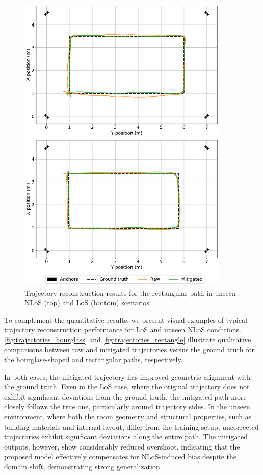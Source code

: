 \begin{figure}[tbh]
    \centering
    \includegraphics[width=0.9\textwidth]{Figures/experiments_and_results/rect_trajectory.pdf}
    \caption{Trajectory reconstruction results for the rectangular path in unseen NLoS (top) and LoS (bottom) scenarios.}
    \label{fig:trajectories_rectangle}
\end{figure}

To complement the quantitative results, we present visual examples of typical trajectory reconstruction performance for LoS and unseen NLoS conditions. \autoref{fig:trajectories_hourglass} and \autoref{fig:trajectories_rectangle} illustrate qualitative comparisons between raw and mitigated trajectories versus the ground truth for the hourglass-shaped and rectangular paths, respectively.

In both cases, the mitigated trajectory has improved geometric alignment with the ground truth. Even in the LoS case, where the original trajectory does not exhibit significant deviations from the ground truth, the mitigated path more closely follows the true one, particularly around trajectory sides. In the unseen environment, where both the room geometry and structural properties, such as building materials and internal layout, differ from the training setup, uncorrected trajectories exhibit significant deviations along the entire path. The mitigated outputs, however, show considerably reduced overshoot, indicating that the proposed model effectively compensates for NLoS-induced bias despite the domain shift, demonstrating strong generalization.